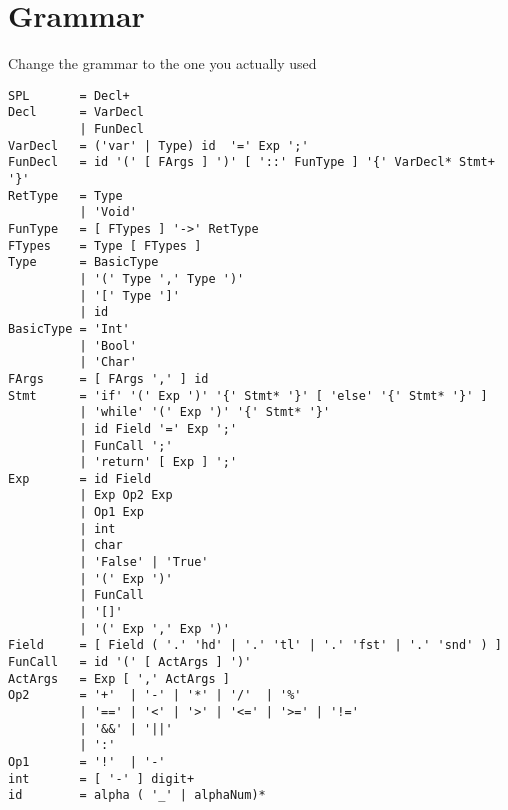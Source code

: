\documentclass{report}
\begin{document}
\appendix
\chapter{Grammar}
Change the grammar to the one you actually used

\begin{verbatim}
SPL       = Decl+
Decl      = VarDecl
          | FunDecl
VarDecl   = ('var' | Type) id  '=' Exp ';'
FunDecl   = id '(' [ FArgs ] ')' [ '::' FunType ] '{' VarDecl* Stmt+ '}'
RetType   = Type
          | 'Void'
FunType   = [ FTypes ] '->' RetType
FTypes    = Type [ FTypes ]
Type      = BasicType
          | '(' Type ',' Type ')'
          | '[' Type ']'
          | id
BasicType = 'Int'
          | 'Bool'
          | 'Char'
FArgs     = [ FArgs ',' ] id
Stmt      = 'if' '(' Exp ')' '{' Stmt* '}' [ 'else' '{' Stmt* '}' ]
          | 'while' '(' Exp ')' '{' Stmt* '}'
          | id Field '=' Exp ';'
          | FunCall ';'
          | 'return' [ Exp ] ';'
Exp       = id Field
          | Exp Op2 Exp
          | Op1 Exp
          | int
          | char
          | 'False' | 'True'
          | '(' Exp ')'
          | FunCall
          | '[]'
          | '(' Exp ',' Exp ')'
Field     = [ Field ( '.' 'hd' | '.' 'tl' | '.' 'fst' | '.' 'snd' ) ]
FunCall   = id '(' [ ActArgs ] ')'
ActArgs   = Exp [ ',' ActArgs ]
Op2       = '+'  | '-' | '*' | '/'  | '%'
          | '==' | '<' | '>' | '<=' | '>=' | '!='
          | '&&' | '||'
          | ':'
Op1       = '!'  | '-'
int       = [ '-' ] digit+
id        = alpha ( '_' | alphaNum)*
\end{verbatim}
\end{document}
